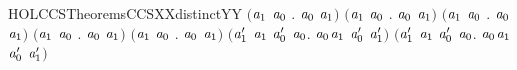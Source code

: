 \begin{SaveVerbatim}{HOLCCSTheoremsCCSXXdistinctYY}
   \ensuremath{(}\HOLSymConst{\HOLTokenForall{}}\ensuremath{\HOLBoundVar{a}\sb{\mathrm{1}}} \ensuremath{\HOLBoundVar{a}\sb{\mathrm{0}}} .   \HOLSymConst{\HOLTokenNotEqual{}} \ensuremath{\HOLBoundVar{a}\sb{\mathrm{0}}} \HOLSymConst{\ensuremath{+}} \ensuremath{\HOLBoundVar{a}\sb{\mathrm{1}}}\ensuremath{)} \HOLSymConst{\HOLTokenConj{}} \ensuremath{(}\HOLSymConst{\HOLTokenForall{}}\ensuremath{\HOLBoundVar{a}\sb{\mathrm{1}}} \ensuremath{\HOLBoundVar{a}\sb{\mathrm{0}}} .   \HOLSymConst{\HOLTokenNotEqual{}} \ensuremath{\HOLBoundVar{a}\sb{\mathrm{0}}} \HOLSymConst{\ensuremath{\mid}} \ensuremath{\HOLBoundVar{a}\sb{\mathrm{1}}}\ensuremath{)} \HOLSymConst{\HOLTokenConj{}}
   \ensuremath{(}\HOLSymConst{\HOLTokenForall{}}\ensuremath{\HOLBoundVar{a}\sb{\mathrm{1}}} \ensuremath{\HOLBoundVar{a}\sb{\mathrm{0}}} .   \HOLSymConst{\HOLTokenNotEqual{}}  \ensuremath{\HOLBoundVar{a}\sb{\mathrm{0}}} \ensuremath{\HOLBoundVar{a}\sb{\mathrm{1}}}\ensuremath{)} \HOLSymConst{\HOLTokenConj{}}
   \ensuremath{(}\HOLSymConst{\HOLTokenForall{}}\ensuremath{\HOLBoundVar{a}\sb{\mathrm{1}}} \ensuremath{\HOLBoundVar{a}\sb{\mathrm{0}}} .   \HOLSymConst{\HOLTokenNotEqual{}}  \ensuremath{\HOLBoundVar{a}\sb{\mathrm{0}}} \ensuremath{\HOLBoundVar{a}\sb{\mathrm{1}}}\ensuremath{)} \HOLSymConst{\HOLTokenConj{}}
   \ensuremath{(}\HOLSymConst{\HOLTokenForall{}}\ensuremath{\HOLBoundVar{a}\sb{\mathrm{1}}} \ensuremath{\HOLBoundVar{a}\sb{\mathrm{0}}} .   \HOLSymConst{\HOLTokenNotEqual{}}  \ensuremath{\HOLBoundVar{a}\sb{\mathrm{0}}} \ensuremath{\HOLBoundVar{a}\sb{\mathrm{1}}}\ensuremath{)} \HOLSymConst{\HOLTokenConj{}}
   \ensuremath{(}\HOLSymConst{\HOLTokenForall{}}\ensuremath{\HOLBoundVar{a}\sb{\mathrm{1}}\sp{\prime{}}} \ensuremath{\HOLBoundVar{a}\sb{\mathrm{1}}} \ensuremath{\HOLBoundVar{a}\sb{\mathrm{0}}\sp{\prime{}}} \ensuremath{\HOLBoundVar{a}\sb{\mathrm{0}}}. \ensuremath{\HOLBoundVar{a}\sb{\mathrm{0}}}\HOLSymConst{\ensuremath{\ldotp}}\ensuremath{\HOLBoundVar{a}\sb{\mathrm{1}}} \HOLSymConst{\HOLTokenNotEqual{}} \ensuremath{\HOLBoundVar{a}\sb{\mathrm{0}}\sp{\prime{}}} \HOLSymConst{\ensuremath{+}} \ensuremath{\HOLBoundVar{a}\sb{\mathrm{1}}\sp{\prime{}}}\ensuremath{)} \HOLSymConst{\HOLTokenConj{}}
   \ensuremath{(}\HOLSymConst{\HOLTokenForall{}}\ensuremath{\HOLBoundVar{a}\sb{\mathrm{1}}\sp{\prime{}}} \ensuremath{\HOLBoundVar{a}\sb{\mathrm{1}}} \ensuremath{\HOLBoundVar{a}\sb{\mathrm{0}}\sp{\prime{}}} \ensuremath{\HOLBoundVar{a}\sb{\mathrm{0}}}. \ensuremath{\HOLBoundVar{a}\sb{\mathrm{0}}}\HOLSymConst{\ensuremath{\ldotp}}\ensuremath{\HOLBoundVar{a}\sb{\mathrm{1}}} \HOLSymConst{\HOLTokenNotEqual{}} \ensuremath{\HOLBoundVar{a}\sb{\mathrm{0}}\sp{\prime{}}} \HOLSymConst{\ensuremath{\mid}} \ensuremath{\HOLBoundVar{a}\sb{\mathrm{1}}\sp{\prime{}}}\ensuremath{)} \HOLSymConst{\HOLTokenConj{}}

\end{SaveVerbatim}
